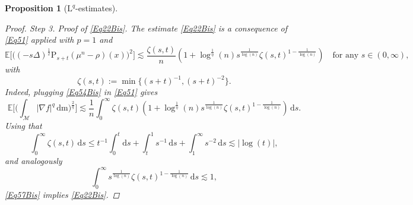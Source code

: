 \documentclass[11pt,a4paper,oneside]{amsart}
\numberwithin{equation}{section}
\newtheorem{proposition}[theorem]{Proposition}
\newcommand{\dd}{\mathrm{d}}
\newcommand{\LL}{\mathrm{L}}
\newcommand{\m}{\mathrm{m}}
\begin{document}
\begin{proposition}[$\LL^{q}$-estimates]
\begin{proof}
%
\medskip
%

{\sc Step 3. Proof of \eqref{Eq22Bis}. }The estimate \eqref{Eq22Bis} is a consequence of \eqref{Eq51} applied with $p=1$ and 
%
\begin{equation}\label{Eq54Bis}
\mathbb{E}\Big[\Big((-s\Delta)^{\frac{1}{2}}\text{P}_{s+t}(\mu^n-\rho)(x)\Big)^2\Big]\lesssim \frac{\zeta(s,t)}{n}(1+\log^{\frac{1}{\eta}}(n)s^{\frac{1}{\log(n)}}\zeta(s,t)^{1-\frac{1}{\log(n)}}) \quad\text{for any  $s\in (0,\infty)$,}
\end{equation}
%
with 
%
\begin{equation}\label{DefZeta}
%
\zeta(s,t):=\min\big\{(s+t)^{-1},(s+t)^{-2}\big\}.
%
\end{equation}
%
Indeed, plugging \eqref{Eq54Bis} in \eqref{Eq51} gives
%
\begin{equation}\label{Eq57Bis}
%
\mathbb{E}\bigg[\Big(\int_{\mathcal{M}}\vert\nabla f\vert^q\,\dd\m\Big)^{\frac{2}{q}}\bigg]\lesssim \frac{1}{n}\int_{0}^{\infty}\zeta(s,t)(1+\log^{\frac{1}{\eta}}(n)s^{\frac{1}{\log(n)}}\zeta(s,t)^{1-\frac{1}{\log(n)}})\,\dd s.
%
\end{equation}
%
Using that 
%
$$\int_{0}^{\infty}\zeta(s,t)\,\dd s\leq t^{-1}\int_{0}^t\dd s+\int_{t}^1s^{-1}\,\dd s+\int_{1}^{\infty}s^{-2}\,\dd s\lesssim \vert\log(t)\vert,$$
%
and analogously
%
$$\int_{0}^{\infty}s^{\frac{1}{\log(n)}}\zeta(s,t)^{1-\frac{1}{\log(n)}}\,\dd s\lesssim 1,$$
%
\eqref{Eq57Bis} implies \eqref{Eq22Bis}.

%
\medskip
%


\end{proof}
\end{proposition}
\end{document}
